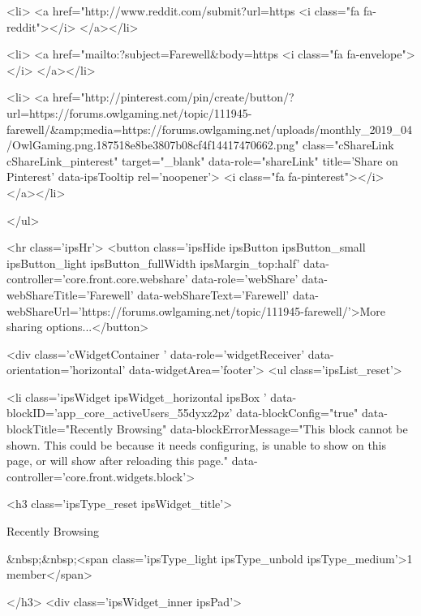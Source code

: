 			<li>
<a href="http://www.reddit.com/submit?url=https%
	<i class="fa fa-reddit"></i>
</a></li>
		
			<li>
<a href="mailto:?subject=Farewell&body=https%
	<i class="fa fa-envelope"></i>
</a></li>
		
			<li>
<a href="http://pinterest.com/pin/create/button/?url=https://forums.owlgaming.net/topic/111945-farewell/&amp;media=https://forums.owlgaming.net/uploads/monthly_2019_04/OwlGaming.png.187518e8be3807b08cf4f14417470662.png" class="cShareLink cShareLink_pinterest" target="_blank" data-role="shareLink" title='Share on Pinterest' data-ipsTooltip rel='noopener'>
	<i class="fa fa-pinterest"></i>
</a></li>
		
	</ul>


	<hr class='ipsHr'>
	<button class='ipsHide ipsButton ipsButton_small ipsButton_light ipsButton_fullWidth ipsMargin_top:half' data-controller='core.front.core.webshare' data-role='webShare' data-webShareTitle='Farewell' data-webShareText='Farewell' data-webShareUrl='https://forums.owlgaming.net/topic/111945-farewell/'>More sharing options...</button>




								


	<div class='cWidgetContainer '  data-role='widgetReceiver' data-orientation='horizontal' data-widgetArea='footer'>
		<ul class='ipsList_reset'>
			
				
					
					<li class='ipsWidget ipsWidget_horizontal ipsBox  ' data-blockID='app_core_activeUsers_55dyxz2pz' data-blockConfig="true" data-blockTitle="Recently Browsing" data-blockErrorMessage="This block cannot be shown. This could be because it needs configuring, is unable to show on this page, or will show after reloading this page."  data-controller='core.front.widgets.block'>

<h3 class='ipsType_reset ipsWidget_title'>
	
		Recently Browsing
	
	
		&nbsp;&nbsp;<span class='ipsType_light ipsType_unbold ipsType_medium'>1 member</span>
	
</h3>
<div class='ipsWidget_inner ipsPad'>
	
